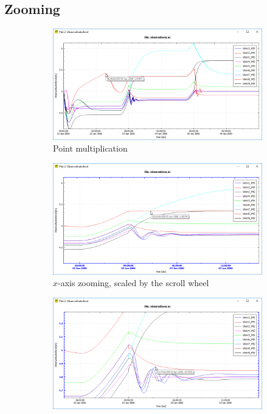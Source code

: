\documentclass{deltares_memo}
\begin{document}
\subsection{Zooming}
\phantom{m}\vspace{-\baselineskip}\begin{figure}[H]
    \centering
    \begin{subfigure}{0.3\textwidth}
    \includegraphics[width=\textwidth]{pictures/plot_zoom_point_multiplication.png}
    \caption{Point multiplication\newline}
    \end{subfigure}
\hfill
    \begin{subfigure}{0.3\textwidth}
    \includegraphics[width=\textwidth]{pictures/plot_zoom_x_axis.png}
    \caption{$x$-axis zooming, scaled by the scroll wheel}
    \end{subfigure}
\hfill
    \begin{subfigure}{0.3\textwidth}
    \includegraphics[width=\textwidth]{pictures/plot_zoom_y_axis.png}

\end{subfigure}
\end{figure}
\end{document}
